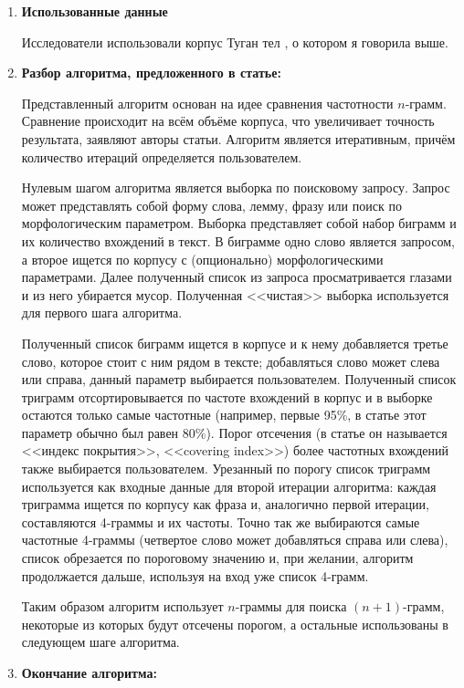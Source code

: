 \begin{enumerate}

\item\textbf{Использованные данные}

Исследователи использовали корпус Туган тел \cite{tugan_tel}, о котором я говорила выше. 

\item\textbf{Разбор алгоритма, предложенного в статье:}

Представленный алгоритм основан на идее сравнения частотности $n$-грамм. Сравнение происходит на всём 
объёме корпуса, что увеличивает точность результата, заявляют авторы статьи. Алгоритм является итеративным, причём количество итераций определяется пользователем.

Нулевым шагом алгоритма является выборка по поисковому запросу. Запрос может 
представлять собой форму слова, лемму, фразу или поиск по морфологическим параметром. 
Выборка представляет собой набор биграмм и их количество вхождений в текст. В биграмме одно 
слово является запросом, а второе ищется по корпусу с (опционально) морфологическими параметрами. Далее полученный список из запроса просматривается глазами и из него убирается мусор. Полученная <<чистая>> выборка используется для первого шага алгоритма.

Полученный список биграмм ищется в корпусе и к нему добавляется третье слово, которое стоит с ним рядом в тексте; добавляться слово может слева или справа, данный параметр выбирается пользователем. Полученный список триграмм отсортировывается по частоте 
вхождений в корпус и в выборке остаются только самые частотные (например, первые 95\%, в статье этот параметр обычно был равен 80\%). Порог отсечения (в статье он называется <<индекс 
покрытия>>, <<covering index>>) более частотных вхождений также выбирается пользователем. 
Урезанный по порогу список триграмм используется как входные данные для второй итерации 
алгоритма: каждая триграмма ищется по корпусу как фраза и, аналогично первой итерации, 
составляются 4-граммы и их частоты. Точно так же выбираются самые частотные 4-граммы 
(четвертое слово может добавляться справа или слева), список обрезается по пороговому значению и, при желании, алгоритм продолжается дальше, используя на вход уже список 4-грамм.

Таким образом алгоритм использует $n$-граммы для поиска $(n+1)$-грамм, некоторые из которых будут отсечены порогом, а остальные использованы в следующем шаге алгоритма.

\item\textbf{Окончание алгоритма:}


\end{enumerate}
